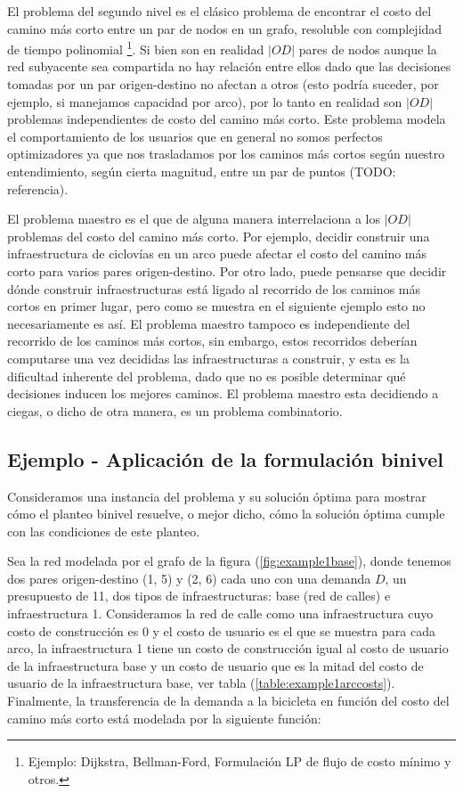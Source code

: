 \documentclass{article}
\begin{document}
  El problema del segundo nivel es el clásico problema de encontrar el costo del camino más corto entre un par de nodos en un grafo, resoluble con complejidad de tiempo polinomial \footnote{Ejemplo: Dijkstra, Bellman-Ford, Formulación LP de flujo de costo mínimo y otros.}. Si bien son en realidad $|OD|$ pares de nodos aunque la red subyacente sea compartida no hay relación entre ellos dado que las decisiones tomadas por un par origen-destino no afectan a otros (esto podría suceder, por ejemplo, si manejamos capacidad por arco), por lo tanto en realidad son $|OD|$ problemas independientes de costo del camino más corto. Este problema modela el comportamiento de los usuarios que en general no somos perfectos optimizadores ya que nos trasladamos por los caminos más cortos según nuestro entendimiento, según cierta magnitud, entre un par de puntos (TODO: referencia).

  El problema maestro es el que de alguna manera interrelaciona a los $|OD|$ problemas del costo del camino más corto. Por ejemplo, decidir construir una infraestructura de ciclovías en un arco puede afectar el costo del camino más corto para varios pares origen-destino. Por otro lado, puede pensarse que decidir dónde construir infraestructuras está ligado al recorrido de los caminos más cortos en primer lugar, pero como se muestra en el siguiente ejemplo esto no necesariamente es así. El problema maestro tampoco es independiente del recorrido de los caminos más cortos, sin embargo, estos recorridos deberían computarse una vez decididas las infraestructuras a construir, y esta es la dificultad inherente del problema, dado que no es posible determinar qué decisiones inducen los mejores caminos. El problema maestro esta decidiendo a ciegas, o dicho de otra manera, es un problema combinatorio.

  \subsection{Ejemplo - Aplicación de la formulación binivel}

  Consideramos una instancia del problema y su solución óptima para mostrar cómo el planteo binivel resuelve, o mejor dicho, cómo la solución óptima cumple con las condiciones de este planteo.

  Sea la red modelada por el grafo de la figura (\ref{fig:example1base}), donde tenemos dos pares origen-destino (1, 5) y (2, 6) cada uno con una demanda $D$, un presupuesto de 11, dos tipos de infraestructuras: base (red de calles) e infraestructura 1. Consideramos la red de calle como una infraestructura cuyo costo de construcción es 0 y el costo de usuario es el que se muestra para cada arco, la infraestructura 1 tiene un costo de construcción igual al costo de usuario de la infraestructura base y un costo de usuario que es la mitad del costo de usuario de la infraestructura base, ver tabla (\ref{table:example1arccosts}). Finalmente, la transferencia de la demanda a la bicicleta en función del costo del camino más corto está modelada por la siguiente función:
\end{document}
